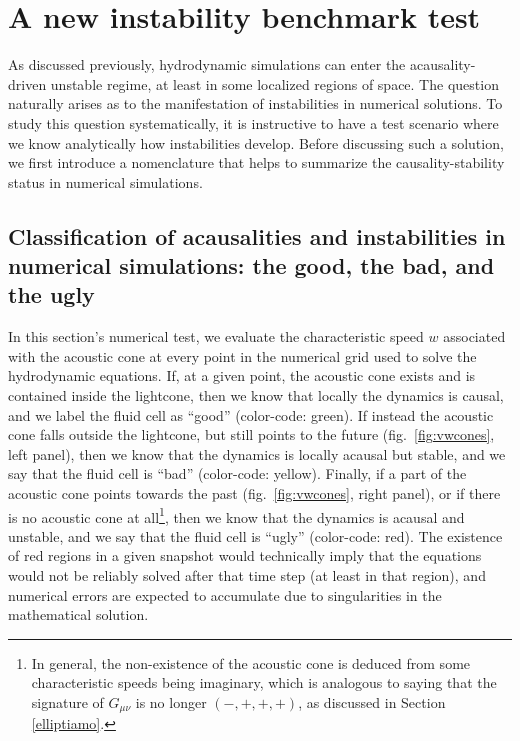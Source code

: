 \documentclass[aps, prd, showkeys,superscriptaddress, nofootinbib,floatfix]{revtex4-2}
\begin{document}
%
%
%
%


\section{A new instability benchmark test}


\label{sec:simple_test}


As discussed previously, hydrodynamic simulations can enter the acausality-driven unstable regime, at least in some localized regions of space. The question naturally arises as to the manifestation of instabilities in numerical solutions. 
To study this question systematically, it is instructive to have a test scenario where we know analytically how instabilities develop. Before discussing such a solution, we first introduce a nomenclature that helps to summarize the causality-stability status in numerical simulations.



\subsection{Classification of acausalities and instabilities in numerical simulations: the good, the bad, and the ugly}
\label{eq:GBU}



In this section's numerical test, we evaluate the characteristic speed $w$ associated with the acoustic cone at every point in the numerical grid used to solve the hydrodynamic equations. If, at a given point, the acoustic cone exists and is contained inside the lightcone, then we know that locally the dynamics is causal, and we label the fluid cell as ``good'' (color-code: green). If instead the acoustic cone falls outside the lightcone, but still points to the future (fig.~\ref{fig:vwcones}, left panel), then we know that the dynamics is locally acausal but stable, and we say that the fluid cell is ``bad'' (color-code: yellow). Finally, if a part of the acoustic cone points towards the past (fig.~\ref{fig:vwcones}, right panel), or if there is no acoustic cone at all\footnote{In general, the non-existence of the acoustic cone is deduced from some characteristic speeds being imaginary, which is analogous to saying that the signature of $G_{\mu\nu}$ is no longer $(-,+,+,+)$, as discussed in Section \ref{elliptiamo}.}, then we know that the dynamics is acausal and unstable, and we say that the fluid cell is ``ugly'' (color-code: red). The existence of red regions in a given snapshot would technically imply that 
the equations would not be reliably solved after that time step (at least in that region), and numerical errors are expected to accumulate due to singularities in the mathematical solution. 
\end{document}
